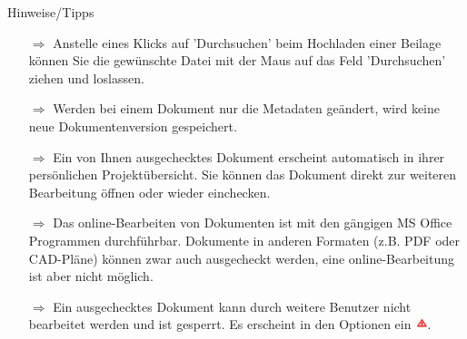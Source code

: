 \documentclass{article}
\begin{document}
\begin{beamerlikethm}{Hinweise/Tipps}
\begin{itemize}
  \item[$\Longrightarrow$] Anstelle eines Klicks auf 'Durchsuchen' beim Hochladen einer Beilage  können Sie die gewünschte Datei mit der Maus auf das Feld 'Durchsuchen' ziehen und loslassen.
	
	
 \item[$\Longrightarrow$] Werden bei einem Dokument nur die Metadaten geändert, wird keine neue Dokumentenversion gespeichert.
 \item[$\Longrightarrow$] Ein von Ihnen ausgechecktes Dokument erscheint automatisch in ihrer persönlichen Projektübersicht. Sie können das Dokument direkt zur weiteren Bearbeitung öffnen oder wieder einchecken.
 \item[$\Longrightarrow$] Das online-Bearbeiten von Dokumenten ist mit den gängigen MS Office Programmen durchführbar. Dokumente in anderen Formaten (z.B. PDF oder CAD-Pläne) können
zwar auch ausgecheckt werden, eine online-Bearbeitung ist aber nicht möglich.
 \item[$\Longrightarrow$] Ein ausgechecktes Dokument kann durch weitere Benutzer nicht bearbeitet werden und ist gesperrt. Es erscheint in den Optionen ein \includegraphics[height=10pt]{Icons/Warnung_rot.jpg}.
\end{itemize}
\end{beamerlikethm}


	
	
\end{document}

